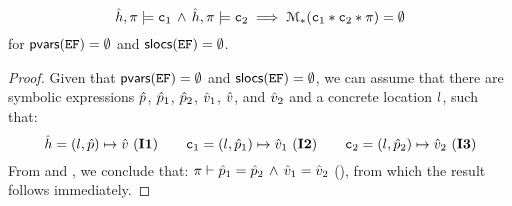 \begin{lemma}
\label{lemma:no:double:unification}
$$
  \hat{h}, \pi \models \mathtt{c}_1 \, \wedge \, \hat{h}, \pi \models \mathtt{c}_2 
    \implies 
        \mathcal{M}_{*}(\mathtt{c}_1 \mathbin{*} \mathtt{c}_2 \mathbin{*} \pi) = \emptyset$$  
for ${\sf pvars}(\mathtt{EF}) = \emptyset$ and ${\sf slocs}(\mathtt{EF}) = \emptyset$.
\end{lemma}
\begin{proof}
Given that ${\sf pvars}(\mathtt{EF}) = \emptyset$ and ${\sf slocs}(\mathtt{EF}) = \emptyset$,
we can assume that there are symbolic expressions $\hat{p}$, 
$\hat{p}_1$, $\hat{p}_2$, $\hat{v}_1$, $\hat{v}$, and $\hat{v}_2$ 
and a concrete location $l$, such that: 
$$
\hat{h} = (l, \hat{p}) \mapsto \hat{v} \text{ ({\bf I1})}
\qquad
\mathtt{c}_1 = (l, \hat{p}_1) \mapsto \hat{v}_1 \text{ ({\bf I2})}
\qquad 
\mathtt{c}_2 = (l, \hat{p}_2) \mapsto \hat{v}_2 \text{ ({\bf I3})}
$$
From  and , we conclude that: 
$\pi \vdash \hat{p}_1 = \hat{p}_2 \, \wedge \, \hat{v}_1 = \hat{v}_2$ (), 
from which the result follows immediately. 
\end{proof}


